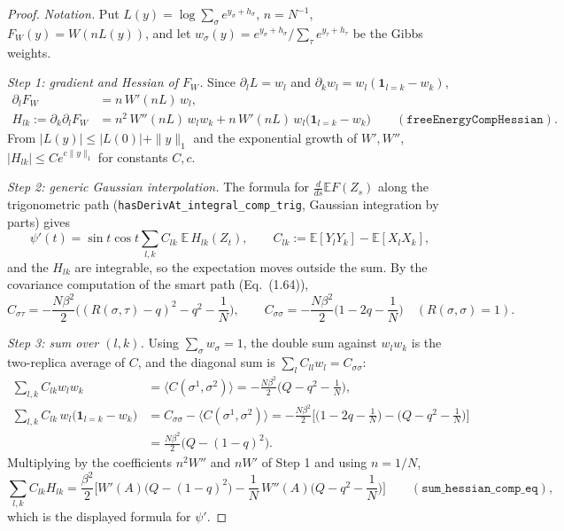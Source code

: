 \begin{proof}
  \leanok
\emph{Notation.} Put $L(y)=\log\sum_\sigma e^{y_\sigma+h_\sigma}$, $n=N^{-1}$, $F_W(y)=W(nL(y))$, and let $w_\sigma(y)=e^{y_\sigma+h_\sigma}/\sum_\tau e^{y_\tau+h_\tau}$ be the Gibbs weights.

\emph{Step 1: gradient and Hessian of $F_W$.} Since $\partial_lL=w_l$ and $\partial_kw_l=w_l(\mathbf 1_{l=k}-w_k)$,
\begin{align*}
\partial_lF_W&=n\,W'(nL)\,w_l,\\
H_{lk}:=\partial_k\partial_lF_W&=n^2\,W''(nL)\,w_lw_k+n\,W'(nL)\,w_l\big(\mathbf 1_{l=k}-w_k\big)\qquad(\texttt{freeEnergyCompHessian}).
\end{align*}
From $|L(y)|\le|L(0)|+\|y\|_1$ and the exponential growth of $W',W''$, $|H_{lk}|\le Ce^{c\|y\|_1}$ for constants $C,c$.

\emph{Step 2: generic Gaussian interpolation.} The formula for $\frac{d}{ds}\mathbb E F(Z_s)$ along the trigonometric path (\texttt{hasDerivAt\_integral\_comp\_trig}, Gaussian integration by parts) gives
\[
\psi'(t)=\sin t\cos t\sum_{l,k}C_{lk}\;\mathbb E\,H_{lk}(Z_t),\qquad C_{lk}:=\mathbb E[Y_lY_k]-\mathbb E[X_lX_k],
\]
and the $H_{lk}$ are integrable, so the expectation moves outside the sum. By the covariance computation of the smart path (Eq.~(1.64)),
\[
C_{\sigma\tau}=-\frac{N\beta^2}{2}\Big((R(\sigma,\tau)-q)^2-q^2-\frac1N\Big),\qquad C_{\sigma\sigma}=-\frac{N\beta^2}{2}\Big(1-2q-\frac1N\Big)\quad(R(\sigma,\sigma)=1).
\]

\emph{Step 3: sum over $(l,k)$.} Using $\sum_\sigma w_\sigma=1$, the double sum against $w_lw_k$ is the two-replica average of $C$, and the diagonal sum is $\sum_lC_{ll}w_l=C_{\sigma\sigma}$:
\begin{align*}
\sum_{l,k}C_{lk}w_lw_k&=\langle C(\sigma^1,\sigma^2)\rangle=-\frac{N\beta^2}{2}\Big(Q-q^2-\frac1N\Big),\\
\sum_{l,k}C_{lk}\,w_l\big(\mathbf 1_{l=k}-w_k\big)&=C_{\sigma\sigma}-\langle C(\sigma^1,\sigma^2)\rangle
=-\frac{N\beta^2}{2}\Big[\Big(1-2q-\frac1N\Big)-\Big(Q-q^2-\frac1N\Big)\Big]\\
&=\frac{N\beta^2}{2}\Big(Q-(1-q)^2\Big).
\end{align*}
Multiplying by the coefficients $n^2W''$ and $nW'$ of Step 1 and using $n=1/N$,
\[
\sum_{l,k}C_{lk}H_{lk}=\frac{\beta^2}{2}\Big[W'(A)\big(Q-(1-q)^2\big)-\frac1N\,W''(A)\Big(Q-q^2-\frac1N\Big)\Big]
\qquad(\texttt{sum\_hessian\_comp\_eq}),
\]
which is the displayed formula for $\psi'$.


\end{proof}
